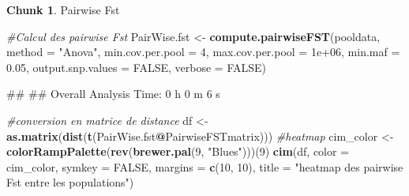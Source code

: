 \documentclass[
  openany]{book}
\newenvironment{Shaded}{\begin{snugshade}}{\end{snugshade}}
\newcommand{\AttributeTok}[1]{\textcolor[rgb]{0.13,0.29,0.53}{#1}}
\newcommand{\CommentTok}[1]{\textcolor[rgb]{0.56,0.35,0.01}{\textit{#1}}}
\newcommand{\ConstantTok}[1]{\textcolor[rgb]{0.56,0.35,0.01}{#1}}
\newcommand{\DecValTok}[1]{\textcolor[rgb]{0.00,0.00,0.81}{#1}}
\newcommand{\FloatTok}[1]{\textcolor[rgb]{0.00,0.00,0.81}{#1}}
\newcommand{\FunctionTok}[1]{\textcolor[rgb]{0.13,0.29,0.53}{\textbf{#1}}}
\newcommand{\NormalTok}[1]{#1}
\newcommand{\OtherTok}[1]{\textcolor[rgb]{0.56,0.35,0.01}{#1}}
\newcommand{\SpecialCharTok}[1]{\textcolor[rgb]{0.81,0.36,0.00}{\textbf{#1}}}
\newcommand{\StringTok}[1]{\textcolor[rgb]{0.31,0.60,0.02}{#1}}
\theoremstyle{definition}
\theoremstyle{definition}
\theoremstyle{definition}
\newtheorem{exercise}{Chunk}[chapter]
\theoremstyle{definition}
\theoremstyle{remark}
\begin{document}
\begin{exercise}
\protect\hypertarget{exr:chunk3}{}\label{exr:chunk3}{Pairwise Fst}
\end{exercise}

\begin{Shaded}
\begin{Highlighting}[]
\CommentTok{\#Calcul des pairwise Fst }
\NormalTok{PairWise.fst }\OtherTok{\textless{}{-}} \FunctionTok{compute.pairwiseFST}\NormalTok{(pooldata,}
                                    \AttributeTok{method =} \StringTok{"Anova"}\NormalTok{,}
                                    \AttributeTok{min.cov.per.pool =} \DecValTok{4}\NormalTok{,}
                                    \AttributeTok{max.cov.per.pool =} \FloatTok{1e+06}\NormalTok{,}
                                    \AttributeTok{min.maf =} \FloatTok{0.05}\NormalTok{,}
                                    \AttributeTok{output.snp.values =} \ConstantTok{FALSE}\NormalTok{,}
                                    \AttributeTok{verbose =} \ConstantTok{FALSE}\NormalTok{)}
\end{Highlighting}
\end{Shaded}

\begin{Shaded}
\begin{Highlighting}[]
\NormalTok{\#\# }
\NormalTok{\#\# Overall Analysis Time: 0 h 0 m 6 s}
\end{Highlighting}
\end{Shaded}

\begin{Shaded}
\begin{Highlighting}[]
\CommentTok{\#conversion en matrice de distance}
\NormalTok{df }\OtherTok{\textless{}{-}} \FunctionTok{as.matrix}\NormalTok{(}\FunctionTok{dist}\NormalTok{(}\FunctionTok{t}\NormalTok{(PairWise.fst}\SpecialCharTok{@}\NormalTok{PairwiseFSTmatrix)))}
\CommentTok{\#heatmap}
\NormalTok{cim\_color }\OtherTok{\textless{}{-}} \FunctionTok{colorRampPalette}\NormalTok{(}\FunctionTok{rev}\NormalTok{(}\FunctionTok{brewer.pal}\NormalTok{(}\DecValTok{9}\NormalTok{, }\StringTok{"Blues"}\NormalTok{)))(}\DecValTok{9}\NormalTok{)}
\FunctionTok{cim}\NormalTok{(df, }\AttributeTok{color =}\NormalTok{ cim\_color, }\AttributeTok{symkey =} \ConstantTok{FALSE}\NormalTok{, }\AttributeTok{margins =} \FunctionTok{c}\NormalTok{(}\DecValTok{10}\NormalTok{, }\DecValTok{10}\NormalTok{),  }\AttributeTok{title =} \StringTok{"heatmap des pairwise Fst entre les populations"}\NormalTok{)}
\end{Highlighting}
\end{Shaded}
\end{document}
